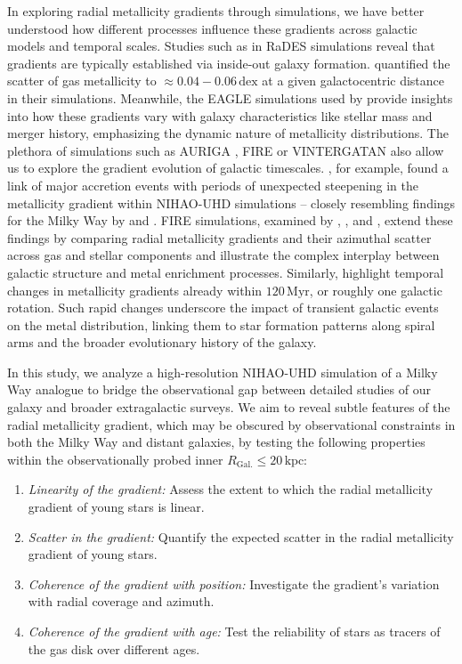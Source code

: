 \documentclass[twocolumn,apj,numberedappendix,appendixfloats,twocolappendix]{openjournal}
\begin{document}
\begin{CJK*}{UTF8}{gbsn}
In exploring radial metallicity gradients through simulations, we have better understood how different processes influence these gradients across galactic models and temporal scales. Studies such as \citet{Pilkington2012} in RaDES simulations reveal that gradients are typically established via inside-out galaxy formation. \citet{Khoperskov2023e} quantified the scatter of gas metallicity to $\approx 0.04-0.06\,\mathrm{dex}$ at a given galactocentric distance in their simulations. Meanwhile, the EAGLE simulations used by \citet{Tissera2019} provide insights into how these gradients vary with galaxy characteristics like stellar mass and merger history, emphasizing the dynamic nature of metallicity distributions. The plethora of simulations such as AURIGA \citep{Grand2016}, FIRE \citep[][see their Fig. 6]{Ma2017} or VINTERGATAN \citep[see their Fig. 9;][]{Agertz2021} also allow us to explore the gradient evolution of galactic timescales. \citet{Buck2023}, for example, found a link of major accretion events with periods of unexpected steepening in the metallicity gradient within NIHAO-UHD simulations -- closely resembling findings for the Milky Way by \citet{Lu2022} and \citet{Ratcliffe2023}. FIRE simulations, examined by \citet{Bellardini2021}, \citet{Bellardini2022}, and \citet{Graf2024}, extend these findings by comparing radial metallicity gradients and their azimuthal scatter across gas and stellar components and illustrate the complex interplay between galactic structure and metal enrichment processes. Similarly, \citet{Grand2015,Grand2016} highlight temporal changes in metallicity gradients already within $120\,\mathrm{Myr}$, or roughly one galactic rotation. Such rapid changes underscore the impact of transient galactic events on the metal distribution, linking them to star formation patterns along spiral arms and the broader evolutionary history of the galaxy.

In this study, we analyze a high-resolution NIHAO-UHD simulation of a Milky Way analogue to bridge the observational gap between detailed studies of our galaxy and broader extragalactic surveys. We aim to reveal subtle features of the radial metallicity gradient, which may be obscured by observational constraints in both the Milky Way and distant galaxies, by testing the following properties within the observationally probed inner $R_\mathrm{Gal.} \leq 20\,\mathrm{kpc}$:
\begin{enumerate}
\item \textit{Linearity of the gradient:} Assess the extent to which the radial metallicity gradient of young stars is linear.
\item \textit{Scatter in the gradient:} Quantify the expected scatter in the radial metallicity gradient of young stars.
\item \textit{Coherence of the gradient with position:} Investigate the gradient's variation with radial coverage and azimuth.
\item \textit{Coherence of the gradient with age:} Test the reliability of stars as tracers of the gas disk over different ages.
\end{enumerate}


\end{CJK*}
\end{document}
